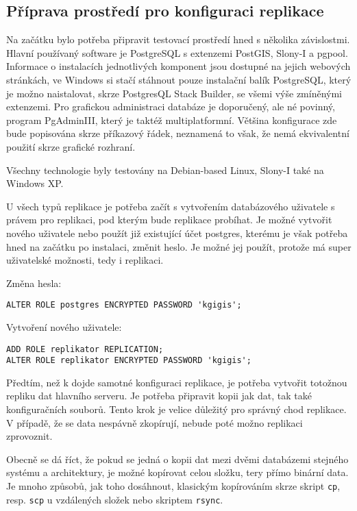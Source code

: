 \subsection{Příprava prostředí pro konfiguraci replikace}
Na začátku bylo potřeba připravit testovací prostředí hned s několika závislostmi. Hlavní používaný software je PostgreSQL s extenzemi PostGIS, Slony-I a pgpool. Informace o instalacích jednotlivých komponent jsou dostupné na jejich webových stránkách, ve Windows si stačí stáhnout pouze instalační balík PostgreSQL, který je možno naistalovat, skrze PostgresQL Stack Builder, se všemi výše zmíněnými extenzemi. Pro grafickou administraci databáze je doporučený, ale né povinný, program PgAdminIII, který je taktéž multiplatformní. Většina konfigurace zde bude popisována skrze příkazový řádek, neznamená to však, že nemá ekvivalentní použití skrze grafické rozhraní.

Všechny technologie byly testovány na Debian-based Linux, Slony-I také na Windows XP. 

U všech typů replikace je potřeba začít s vytvořením databázového uživatele s právem pro replikaci, pod kterým bude replikace probíhat. Je možné vytvořit nového uživatele nebo použít již existující účet postgres, kterému je však potřeba hned na začátku po instalaci, změnit heslo. Je možné jej použít, protože má super uživatelské možnosti, tedy i replikaci.

Změna hesla:

\begin{lstlisting}
ALTER ROLE postgres ENCRYPTED PASSWORD 'kgigis';
\end{lstlisting}

Vytvoření nového uživatele:

\begin{lstlisting}
ADD ROLE replikator REPLICATION;
ALTER ROLE replikator ENCRYPTED PASSWORD 'kgigis';
\end{lstlisting}

Předtím, než k dojde samotné konfiguraci replikace, je potřeba vytvořit totožnou repliku dat hlavního serveru. Je potřeba připravit kopii jak dat, tak také konfiguračních souborů. Tento krok je velice důležitý pro správný chod replikace. V případě, že se data nespávně zkopírují, nebude poté možno replikaci zprovoznit. 

Obecně se dá říct, že pokud se jedná o kopii dat mezi dvěmi databázemi stejného systému a architektury, je možné kopírovat celou složku, tery přímo binární data. Je mnoho způsobů, jak toho dosáhnout, klasickým kopírováním skrze skript \texttt{cp}, resp. \texttt{scp} u vzdálených složek nebo skriptem \texttt{rsync}. 


